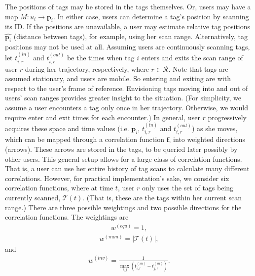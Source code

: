 The positions of tags may be stored in the tags themselves.  Or, users may have a map $M:u_i \rightarrow \mathbf{p}_i$.  In either case, users can determine a tag's position by scanning its ID.  If the positions are unavailable, a user may estimate relative tag positions $\hat{\mathbf{p}_i}$ (distance between tags), for example, using her scan range.  Alternatively, tag positions may not be used at all.  Assuming users are continuously scanning tags, let $t^{\left(in\right)}_{i,r}$ and $t^{\left(out\right)}_{i,r}$ be the times when tag $i$ enters and exits the scan range of user $r$ during her trajectory, respectively, where $r \in \mathcal{R}$.  Note that tags are assumed stationary, and users are mobile. So entering and exiting are with respect to the user's frame of reference. Envisioning tags moving into and out of users' scan ranges provides greater insight to the situation.  (For simplicity, we assume a user encounters a tag only once in her trajectory.  Otherwise, we would require enter and exit times for each encounter.)  In general, user $r$ progressively acquires these space and time values (i.e. $\mathbf{p}_i$, $t^{\left(in\right)}_{i,r}$ and $t^{\left(out\right)}_{i,r}$) as she moves, which can be mapped through a correlation function $\mathbf{f}$, into weighted directions (arrows).  These arrows are stored in the tags, to be queried later possibly by other users.  This general setup allows for a large class of correlation functions.  That is, a user can use her entire history of tag scans to calculate many different correlations.  However, for practical implementation's sake, we consider six correlation functions, where at time $t$, user $r$ only uses the set of tags  being currently scanned, $\mathcal{T}\left( t \right)$.  (That is, these are the tags within her current scan range.)  There are three possible weightings and two possible directions for the correlation functions.  The weightings are
\begin{eqnarray}
w^{\left(equ\right)}  = 1,
\label{Equation: Correlation Weight1}
\end{eqnarray}
\begin{eqnarray}
w^{\left(num\right)}  = \left| \mathcal{T} \left( t \right) \right|,
\label{Equation: Correlation Weight2}
\end{eqnarray}
and
\begin{eqnarray}
w^{\left(inv\right)} = \frac{1}{ \max_{i,j} \left( t^{\left( in \right)}_{i,r} -  t^{\left( in \right)}_{j,r}\right)}.
\label{Equation: Correlation Weight3}
 \end{eqnarray}
